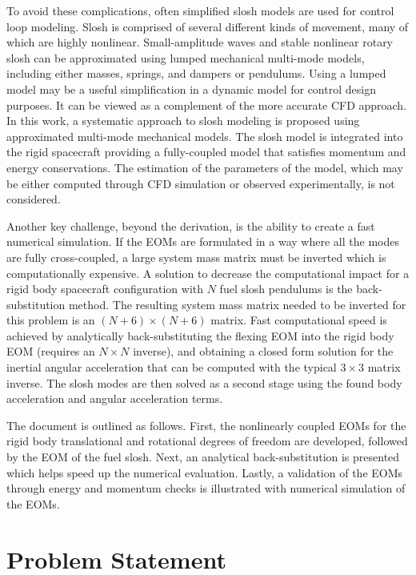 \documentclass[]{BasiliskReportMemo}
\begin{document}
	To avoid these complications, often simplified slosh models are used for control loop modeling. Slosh is comprised of several different kinds of movement, many of which are highly nonlinear. Small-amplitude waves and stable nonlinear rotary slosh can be approximated using lumped mechanical multi-mode models, including either masses, springs, and dampers or pendulums. Using a lumped model may be a useful simplification in a dynamic model for control design purposes. It can be viewed as a complement of the more accurate CFD approach. In this work, a systematic approach to slosh modeling is proposed using approximated multi-mode mechanical models.  The slosh model is integrated into the rigid spacecraft providing a fully-coupled model that satisfies momentum and energy conservations. The estimation of the parameters of the model, which may be either computed through CFD simulation or observed experimentally, is not considered.
	
	Another key challenge, beyond the derivation, is the ability to create a fast numerical simulation.  If the EOMs are formulated in a way where all the modes are fully cross-coupled, a large system mass matrix must be inverted which is computationally expensive. A solution to decrease the computational impact for a rigid body spacecraft configuration with $N$ fuel slosh pendulums is the back-substitution method. The resulting system mass matrix needed to be inverted for this problem is an $(N + 6) \times (N + 6)$ matrix. Fast computational speed is achieved by analytically back-substituting the flexing EOM into the rigid body EOM (requires an $N \times N$ inverse), and obtaining a closed form solution for the inertial angular acceleration that can be computed with the typical $3\times 3$ matrix inverse.  The slosh modes are then solved as a second stage using the found body acceleration and angular acceleration terms.
	
	The document is outlined as follows. First, the nonlinearly coupled EOMs for the rigid body translational and rotational degrees of freedom are developed, followed by the EOM of the fuel slosh.  Next, an analytical back-substitution is presented which helps speed up the numerical evaluation.  Lastly, a validation of the EOMs through energy and momentum checks is illustrated with numerical simulation of the EOMs.
		
	\section{Problem Statement}
	
\end{document}
